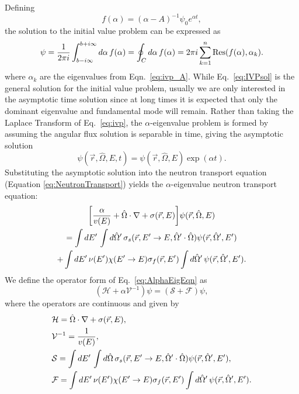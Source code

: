 Defining
\begin{equation}
f(\alpha) = (\alpha - A)^{-1}\psi_{0} e^{\alpha t},
\end{equation}
the solution to the initial value problem can be expressed as
\begin{equation}
	\psi = \frac{1}{2\pi i} \int_{b - i\infty}^{b + i\infty} \mathop{}\!d \alpha \, f(\alpha) = \oint_{C} \mathop{}\!d \alpha \, f(\alpha) = 2 \pi i \sum_{k=1}^{n} \text{Res}(f(\alpha),\alpha_{k}).
	\label{eq:IVPsol}
\end{equation}
where $\alpha_{k}$ are the eigenvalues from Eqn.~\ref{eq:ivp_A}. While Eq.~\ref{eq:IVPsol} is the general solution for the initial value problem, usually we are only interested in the asymptotic time solution since at long times it is expected that only the dominant eigenvalue and fundamental mode will remain. Rather than taking the Laplace Transform of Eq.~\ref{eq:ivp}, the $\alpha$-eigenvalue problem is formed by assuming the angular flux solution is separable in time, giving the asymptotic solution
\begin{equation}
	\psi(\vec{r},\hat{\Omega},E,t) = \psi(\vec{r},\hat{\Omega},E) \exp(\alpha t).
\end{equation}
Substituting the asymptotic solution into the neutron transport equation (Equation \ref{eq:NeutronTransport}) yields the $\alpha$-eigenvalue neutron transport equation:
\begin{multline}
	\bigg [ \frac{\alpha}{v(E)} + \hat{\Omega} \cdot \nabla + \sigma(\vec{r},E) \bigg ] \psi(\vec{r},\hat{\Omega},E) \\ = \int \mathop{}\!d E' \, \int \mathop{}\!d \hat{\Omega}' \, \sigma_{s}(\vec{r},E'\rightarrow E,\hat{\Omega}' \cdot \hat{\Omega}) \psi(\vec{r},\hat{\Omega}',E') \\ + \int \mathop{}\!d E' \, \nu(E') \chi(E'\rightarrow E) \sigma_{f}(\vec{r},E') \int \mathop{}\!d \hat{\Omega}' \, \psi(\vec{r},\hat{\Omega}',E').
	\label{eq:AlphaEigEqn}
\end{multline}
We define the operator form of Eq.~\ref{eq:AlphaEigEqn} as
\begin{equation}
(\mathcal{H} + \alpha \mathcal{V}^{-1}) \psi = ( \mathcal{S} + \mathcal{F} ) \psi,
\label{eq:OpFormAlpha}
\end{equation}
where the operators are continuous and given by
\begin{equation}
	\begin{split}
		& \mathcal{H} = \hat{\Omega} \cdot \nabla + \sigma(\vec{r},E), \\
		& \mathcal{V}^{-1} = \frac{1}{v(E)}, \\
		& \mathcal{S} = \int \mathop{}\!d E' \, \int \mathop{}\!d \hat{\Omega} \, \sigma_{s}(\vec{r},E'\rightarrow E,\hat{\Omega}' \cdot \hat{\Omega}) \psi(\vec{r},\hat{\Omega}',E'), \\
		& \mathcal{F} = \int \mathop{}\!d E' \, \nu(E') \chi(E'\rightarrow E) \sigma_{f}(\vec{r},E') \int \mathop{}\!d \hat{\Omega}' \, \psi(\vec{r},\hat{\Omega}',E').
	\end{split}
\end{equation}

